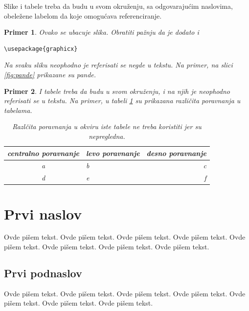 \documentclass[a4paper]{article}
\newtheorem{primer}{Primer}[section]
\begin{document}
Slike i tabele treba da budu u svom okruženju, sa odgovarajućim naslovima, obeležene labelom da koje omogućava referenciranje. 

\begin{primer} Ovako se ubacuje slika. Obratiti pažnju da je dodato i 
\begin{verbatim}
\usepackage{graphicx}
\end{verbatim}


Na svaku sliku neophodno je referisati se negde u tekstu. Na primer, na slici \ref{fig:pande} prikazane su pande. 
\end{primer}

\begin{primer} I tabele treba da budu u svom okruženju, i na njih je neophodno referisati se u tekstu. Na primer, u tabeli \ref{tab:tabela1} su prikazana različita poravnanja u tabelama.

\begin{table}[h!]
\begin{center}
\caption{Razlčita poravnanja u okviru iste tabele ne treba koristiti jer su nepregledna.}
\begin{tabular}{|c|l|r|} \hline
centralno poravnanje& levo poravnanje& desno poravnanje\\ \hline
a &b&c\\ \hline
d &e&f\\ \hline
\end{tabular}
\label{tab:tabela1}
\end{center}
\end{table}

\end{primer}





\section{Prvi naslov}
\label{sec:naslov1}


Ovde pišem tekst. 
Ovde pišem tekst. 
Ovde pišem tekst. 
Ovde pišem tekst. 
Ovde pišem tekst. 
Ovde pišem tekst. 
Ovde pišem tekst. 
Ovde pišem tekst. 


\subsection{Prvi podnaslov}
\label{subsec:podnaslov1}

Ovde pišem tekst. 
Ovde pišem tekst. 
Ovde pišem tekst. 
Ovde pišem tekst. 
Ovde pišem tekst. 
Ovde pišem tekst. 
Ovde pišem tekst. 
\end{document}
